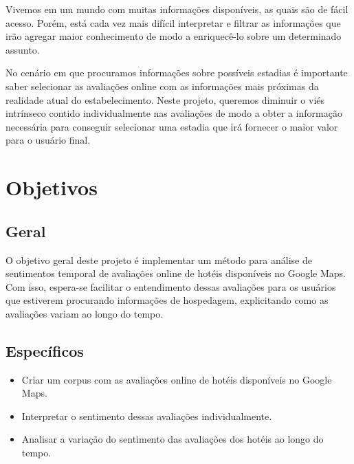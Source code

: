 Vivemos em um mundo com muitas informações disponíveis, as quais são de fácil acesso. Porém, está cada vez mais difícil interpretar e filtrar as informações que irão agregar maior conhecimento de modo a enriquecê-lo sobre um determinado assunto.

No cenário em que procuramos informações sobre possíveis estadias é importante saber selecionar as avaliações online com as informações mais próximas da realidade atual do estabelecimento. Neste projeto, queremos diminuir o viés intrínseco contido individualmente nas avaliações de modo a obter a informação necessária para conseguir selecionar uma estadia que irá fornecer o maior valor para o usuário final.

\section{Objetivos}

\subsection{Geral}

O objetivo geral deste projeto é implementar um método para análise de sentimentos temporal de avaliações online de hotéis disponíveis no Google Maps. Com isso, espera-se facilitar o entendimento dessas avaliações para os usuários que estiverem procurando informações de hospedagem, explicitando como as avaliações variam ao longo do tempo.

\subsection{Específicos}

\begin{itemize}
    \item Criar um corpus com as avaliações online de hotéis disponíveis no Google Maps.
    \item Interpretar o sentimento dessas avaliações individualmente.
    \item Analisar a variação do sentimento das avaliações dos hotéis ao longo do tempo.
\end{itemize}
